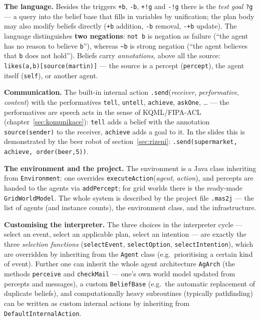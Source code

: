 \documentclass[11pt,a4paper]{article}
\theoremstyle{definition}
\providecommand{\uv}[1]{``#1''}
\begin{document}
\begin{defbox}
\textbf{The language.} Besides the triggers \texttt{+b}, \texttt{-b}, \texttt{+!g} and
\texttt{-!g} there is the \emph{test goal} \texttt{?g} --- a query into the belief base that
fills in variables by unification; the plan body may also modify beliefs directly (\texttt{+b}
addition, \texttt{-b} removal, \texttt{-+b} update). The language distinguishes \textbf{two
negations}: \texttt{not b} is negation as failure (\uv{the agent has no reason to believe
\texttt{b}}), whereas \texttt{\textasciitilde b} is strong negation (\uv{the agent believes
that \texttt{b} does not hold}). Beliefs carry \emph{annotations}, above all the source:
\texttt{likes(a,b)[source(martin)]} --- the source is a percept (\texttt{percept}), the agent
itself (\texttt{self}), or another agent.

\textbf{Communication.} The built-in internal action \texttt{.send}(\emph{receiver},
\emph{performative}, \emph{content}) with the performatives \texttt{tell}, \texttt{untell},
\texttt{achieve}, \texttt{askOne}, \dots{} --- the performatives are speech acts in the sense
of KQML/FIPA-ACL (chapter~\ref{sec:komunikace}): \texttt{tell} adds a belief with the
annotation \texttt{source(sender)} to the receiver, \texttt{achieve} adds a goal to it. In the
slides this is demonstrated by the beer robot of section~\ref{sec:rizeni}:
\texttt{.send(supermarket, achieve, order(beer,5))}.

\textbf{The environment and the project.} The environment is a Java class inheriting from
\texttt{Environment}: one overrides \texttt{executeAction}(\emph{agent}, \emph{action}), and
percepts are handed to the agents via \texttt{addPercept}; for grid worlds there is the
ready-made \texttt{GridWorldModel}. The whole system is described by the project file
\texttt{.mas2j} --- the list of agents (and instance counts), the environment class, and the
infrastructure.

\textbf{Customising the interpreter.} The three choices in the interpreter cycle --- select an
event, select an applicable plan, select an intention --- are exactly the three
\emph{selection functions} (\texttt{selectEvent}, \texttt{selectOption},
\texttt{selectIntention}), which are overridden by inheriting from the \texttt{Agent} class
(e.g.\ prioritising a certain kind of event). Further one can inherit the whole agent
architecture \texttt{AgArch} (the methods \texttt{perceive} and \texttt{checkMail} --- one's
own world model updated from percepts and messages), a custom \texttt{BeliefBase} (e.g.\ the
automatic replacement of duplicate beliefs), and computationally heavy subroutines (typically
pathfinding) can be written as custom internal actions by inheriting from
\texttt{DefaultInternalAction}.
\end{defbox}
\end{document}
